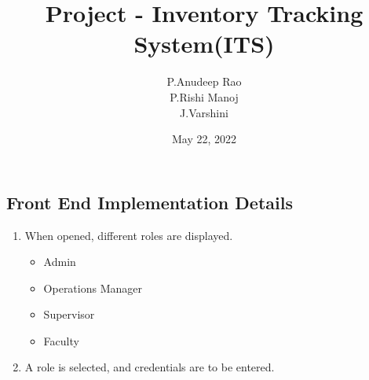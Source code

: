 \documentclass[12pt,a4paper]{article}
\title{\textbf{Project - Inventory Tracking System(ITS)}}
\author{P.Anudeep Rao\\ P.Rishi Manoj\\ J.Varshini}
\date{May 22, 2022}
\begin{document}
    \maketitle
    \begin{Large}
     \centering 
     \section*{Front End Implementation Details}
    \end{Large}
    
    \begin{enumerate}
    \item When opened, different roles are displayed.
    \begin{itemize}
    \item Admin
    \item Operations Manager
    \item Supervisor
    \item Faculty
    \end{itemize}
    \item A role is selected, and credentials are to be entered.
    \end{enumerate}
    
    \newpage 
    
\end{document}
